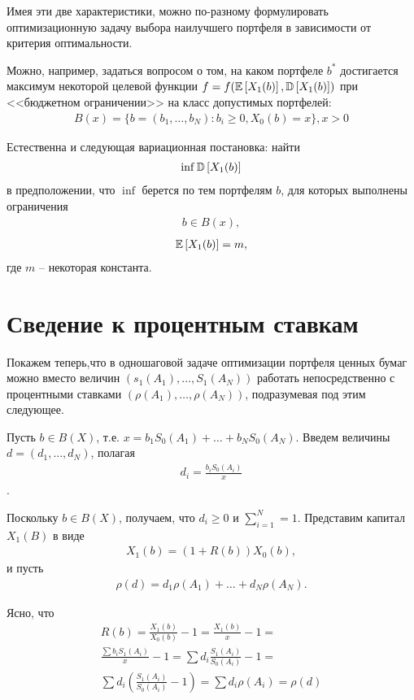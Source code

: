 Имея эти две характеристики, можно по-разному формулировать оптимизационную задачу выбора наилучшего портфеля в
зависимости от критерия оптимальности.

Можно, например, задаться вопросом о том, на каком портфеле $b^*$ достигается максимум некоторой целевой функции 
$f = f(\mathbb{E}\left[X_1(b)\right], \mathbb{D}\left[X_1(b)\right])$ при <<бюджетном ограничении>> на класс допустимых портфелей:
\begin{align}
B(x) = \{b=(b_1, \dots, b_N): b_i \ge 0, X_0(b) = x\}, x > 0
\end{align}

Естественна и следующая вариационная постановка: найти
\begin{align}
\inf \mathbb{D}\left[X_1(b)\right]
\end{align}
в предположении, что $\inf$ берется по тем портфелям $b$, для которых выполнены ограничения
\begin{align}
b \in B(x),
\end{align}
\begin{align}
\mathbb{E}\left[X_1(b)\right] = m,
\end{align}
где $m$ -- некоторая константа.

\section{Сведение к процентным ставкам}

Покажем теперь,что в одношаговой задаче оптимизации портфеля ценных бумаг можно вместо величин $(s_1(A_1), \dots, S_1(A_N))$
работать непосредственно с процентными ставками $(\rho(A_1), \dots, \rho(A_N))$, подразумевая под этим следующее.

Пусть $b \in B(X)$, т.е. $x = b_1 S_0(A_1) + \dots + b_N S_0(A_N)$. Введем величины $d = (d_1, \dots, d_N)$, полагая
\begin{align}
d_i = \frac{b_i S_0(A_i)}{x}
\end{align}.

Поскольку $b \in B(X)$, получаем, что $d_i \ge 0$ и $\sum_{i=1}^{N} = 1$. Представим капитал $X_1(B)$ в виде
\begin{align}
X_1(b) = (1 + R(b))X_0(b) ,
\end{align}
и пусть
\begin{align}
\rho(d) = d_1 \rho(A_1) + \dots + d_N \rho(A_N) .
\end{align}

Ясно, что 
\begin{align}
R(b) = 
	\frac{X_1(b)}{X_0(b)} - 1 = 
	\frac{X_1(b)}{x} - 1 = \\
	\frac{\sum b_i S_1(A_i)}{x} - 1 =
	\sum d_i \frac{S_1(A_i)}{S_0(A_i)} - 1 = \\
	\sum d_i \left( \frac{S_1(A_i)}{S_0(A_i)} - 1\right) =
	\sum d_i \rho(A_i) = 
	\rho(d)
\end{align}

